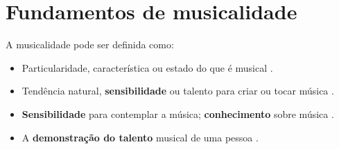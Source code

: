 
\chapter{Fundamentos de musicalidade}
\label{chap:FundamentosMusicalidade}

\begin{definition}[Musicalidade] 
\label{def:Musicalidade}
A musicalidade pode ser definida como:
\begin{itemize}
\item Particularidade, característica ou estado do que é musical \cite{diciomusicalidade}.
\item Tendência natural, \textbf{sensibilidade} ou talento para criar ou 
tocar música \cite{diciomusicalidade} \cite{merriamwebster-musicalidade}.
\item \textbf{Sensibilidade} para contemplar a música; 
\textbf{conhecimento} sobre música \cite{diciomusicalidade}  \cite{merriamwebster-musicalidade}.
\item A \textbf{demonstração do talento} musical de uma pessoa \cite{diciomusicalidade}.
\end{itemize}
\end{definition}













% 
% 


